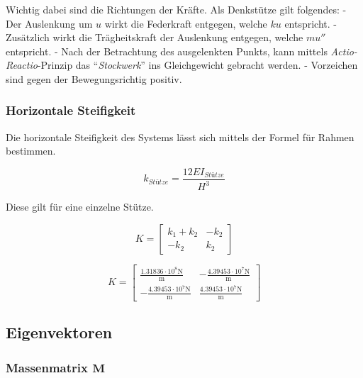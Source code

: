 \documentclass[
  letterpaper,
  DIV=11]{scrreprt}
\begin{document}
Wichtig dabei sind die Richtungen der Kräfte. Als Denkstütze gilt
folgendes: - Der Auslenkung um \(u\) wirkt die Federkraft entgegen,
welche \(k u\) entspricht. - Zusätzlich wirkt die Trägheitskraft der
Auslenkung entgegen, welche \(m u''\) entspricht. - Nach der Betrachtung
des ausgelenkten Punkts, kann mittels \emph{Actio-Reactio}-Prinzip das
``\emph{Stockwerk}'' ins Gleichgewicht gebracht werden. - Vorzeichen
sind gegen der Bewegungsrichtig positiv.

\hypertarget{horizontale-steifigkeit-3}{%
\subsubsection{Horizontale
Steifigkeit}\label{horizontale-steifigkeit-3}}

Die horizontale Steifigkeit des Systems lässt sich mittels der Formel
für Rahmen bestimmen.

\[k_{Stütze} = \frac{12EI_{Stütze}}{H^3}\]

Diese gilt für eine einzelne Stütze.

\begin{equation*}K = \left[\begin{matrix}k_{1} + k_{2} & - k_{2}\\- k_{2} & k_{2}\end{matrix}\right]\end{equation*}

\begin{equation*}K = \left[\begin{matrix}\frac{1.31836 \cdot 10^{8} \text{N}}{\text{m}} & - \frac{4.39453 \cdot 10^{7} \text{N}}{\text{m}}\\- \frac{4.39453 \cdot 10^{7} \text{N}}{\text{m}} & \frac{4.39453 \cdot 10^{7} \text{N}}{\text{m}}\end{matrix}\right]\end{equation*}

\hypertarget{eigenvektoren-4}{%
\subsection{Eigenvektoren}\label{eigenvektoren-4}}

\hypertarget{massenmatrix-mathbfm-3}{%
\subsubsection{\texorpdfstring{Massenmatrix
\(\mathbf{M}\)}{Massenmatrix \textbackslash mathbf\{M\}}}\label{massenmatrix-mathbfm-3}}
\end{document}
